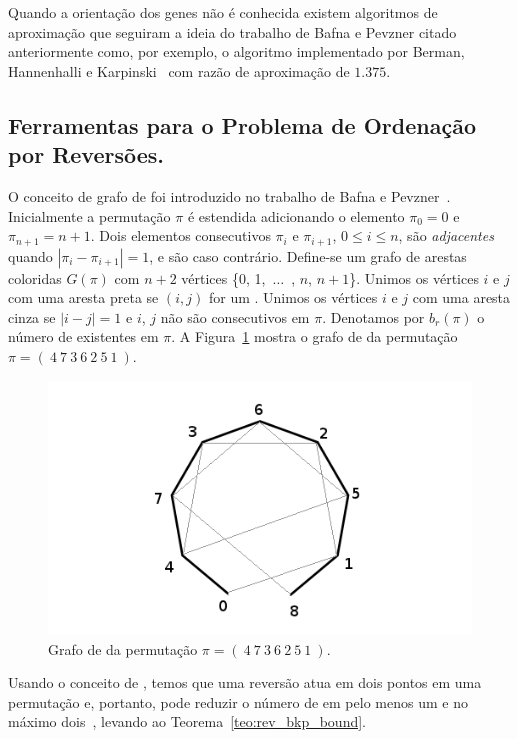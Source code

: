 Quando a orientação dos genes não é conhecida existem algoritmos de
aproximação que seguiram a ideia do trabalho de Bafna e Pevzner citado
anteriormente como, por exemplo, o algoritmo implementado por Berman,
Hannenhalli e Karpinski~\cite{BermanHannenhalliKarpinski*2002} com
razão de aproximação de $1.375$.

\subsection{Ferramentas para o Problema de Ordenação por Reversões.}
\label{subsec:toolrev}
O conceito de grafo de \bkp{} foi introduzido no trabalho de Bafna e
Pevzner~\cite{BafnaPevzner*1996}. Inicialmente a permutação $\pi$ é
estendida adicionando o elemento $\pi_{0} = 0$ e $\pi_{n+1} =
n+1$. Dois elementos consecutivos $\pi_{i}$ e $\pi_{i+1}$, $0 \le
i \le n$, são \textit{adjacentes} quando $|\pi_{i} - \pi_{i+1}| = 1$,
e são  caso contrário. Define-se um grafo de arestas
coloridas $G(\pi)$ com $n + 2$ vértices \{0, 1,~$\ldots$~, $n$, $n +
1$\}. Unimos os vértices $i$ e $j$ com uma aresta preta se $(i, j)$
for um . Unimos os vértices $i$ e $j$ com uma aresta
cinza se $|i - j| = 1$ e $i$, $j$ não são consecutivos em
$\pi$. Denotamos por $b_r(\pi)$ o número de \bkp{} existentes em
$\pi$. A Figura~\ref{fig:rev_grafo_bkp} mostra o grafo de \bkp{} da
permutação $\pi = (~4~7~3~6~2~5~1~)$.

\begin{figure}[h]
  \centering 
  \includegraphics[scale=0.6]{images/rev_grafo_bkp.png} 
  \caption{Grafo de \bkp{} da permutação $\pi = (~4~7~3~6~2~5~1~)$.}
  \label{fig:rev_grafo_bkp}
\end{figure}

Usando o conceito de \bkp{}, temos que uma reversão atua em dois
pontos em uma permutação e, portanto, pode reduzir o número de \bkp{}
em pelo menos um e no máximo dois~\cite{BafnaPevzner*1996}, levando ao
Teorema~\ref{teo:rev_bkp_bound}. 

